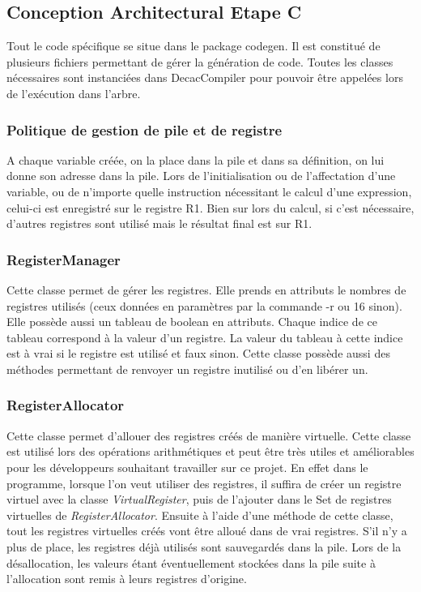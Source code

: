 \documentclass[12pt, a4paper, one side]{article}
\begin{document}
    \subsection{Conception Architectural Etape C}

    Tout le code spécifique se situe dans le package codegen. Il est constitué de plusieurs fichiers
    permettant de gérer la génération de code. Toutes les classes nécessaires sont instanciées dans DecacCompiler
    pour pouvoir être appelées lors de l'exécution  dans l'arbre.

    \subsubsection{Politique de gestion de pile et de registre}

    A chaque variable créée, on la place dans la pile et dans sa définition, on lui donne son adresse dans la pile.
    Lors de l'initialisation ou de l'affectation d'une variable, ou de n'importe quelle instruction nécessitant le
    calcul d'une expression, celui-ci est enregistré sur le registre R1. Bien sur lors du calcul, si c'est nécessaire,
    d'autres registres sont utilisé mais le résultat final est sur R1.

    \subsubsection{RegisterManager}

    Cette classe permet de gérer les registres. Elle prends en attributs le nombres de registres utilisés
    (ceux données en paramètres par la commande -r ou 16 sinon). Elle possède aussi un tableau de boolean
    en attributs. Chaque indice de ce tableau correspond à la valeur d'un registre. La valeur du tableau
    à cette indice est à vrai si le registre est utilisé et faux sinon. Cette classe possède aussi des
    méthodes permettant de renvoyer un registre inutilisé ou d'en libérer un.

    \subsubsection{RegisterAllocator}

    Cette classe permet d'allouer des registres créés de manière virtuelle.
    Cette classe est utilisé lors des opérations arithmétiques et peut être
    très utiles et améliorables pour les développeurs souhaitant travailler
    sur ce projet. En effet dans le programme, lorsque l'on veut utiliser
    des registres, il suffira de créer un registre virtuel avec la classe
    \textit{VirtualRegister}, puis de l'ajouter dans le Set de registres
    virtuelles de \textit{RegisterAllocator}. Ensuite à l'aide d'une méthode
    de cette classe, tout les registres virtuelles créés vont être alloué
    dans de vrai registres. S'il n'y a plus de place, les registres déjà utilisés sont sauvegardés dans la pile.
    Lors de la désallocation, les valeurs étant éventuellement stockées dans la
    pile suite à l'allocation sont remis à leurs registres d'origine.
\end{document}
